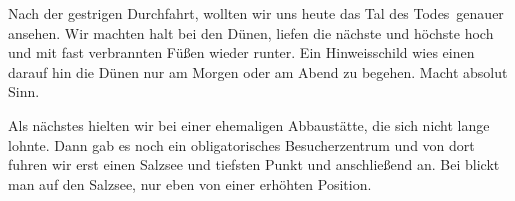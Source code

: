 Nach der gestrigen Durchfahrt, wollten wir uns heute das \glqq Tal des Todes\grqq\, genauer ansehen.
Wir machten halt bei den Dünen, liefen die nächste und höchste hoch und mit fast verbrannten Füßen wieder runter.
Ein Hinweisschild wies einen darauf hin die Dünen nur am Morgen oder am Abend zu begehen.
Macht absolut Sinn.

Als nächstes hielten wir bei einer ehemaligen Abbaustätte, die sich nicht lange lohnte.
Dann gab es noch ein obligatorisches Besucherzentrum und von dort fuhren wir erst einen Salzsee und tiefsten Punkt  und anschließend  an.
Bei  blickt man auf den Salzsee, nur eben von einer erhöhten Position.

\thispagestyle{empty}
\newpage

\thispagestyle{empty}
\newpage


